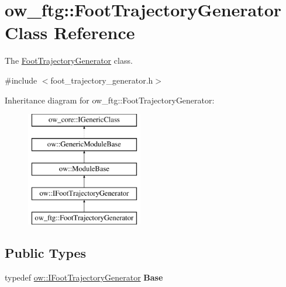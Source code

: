 \hypertarget{classow__ftg_1_1FootTrajectoryGenerator}{}\section{ow\+\_\+ftg\+:\+:Foot\+Trajectory\+Generator Class Reference}
\label{classow__ftg_1_1FootTrajectoryGenerator}


The \hyperlink{classow__ftg_1_1FootTrajectoryGenerator}{Foot\+Trajectory\+Generator} class.  




{\ttfamily \#include $<$foot\+\_\+trajectory\+\_\+generator.\+h$>$}

Inheritance diagram for ow\+\_\+ftg\+:\+:Foot\+Trajectory\+Generator\+:\begin{figure}[H]
\begin{center}
\leavevmode
\includegraphics[height=5.000000cm]{d8/d2f/classow__ftg_1_1FootTrajectoryGenerator}
\end{center}
\end{figure}
\subsection*{Public Types}
\begin{DoxyCompactItemize}
\item 
typedef \hyperlink{classow_1_1IFootTrajectoryGenerator}{ow\+::\+I\+Foot\+Trajectory\+Generator} {\bfseries Base}\hypertarget{classow__ftg_1_1FootTrajectoryGenerator_a36b0e75d6890a907b97e771c9ae5eb95}{}\label{classow__ftg_1_1FootTrajectoryGenerator_a36b0e75d6890a907b97e771c9ae5eb95}

\end{DoxyCompactItemize}
